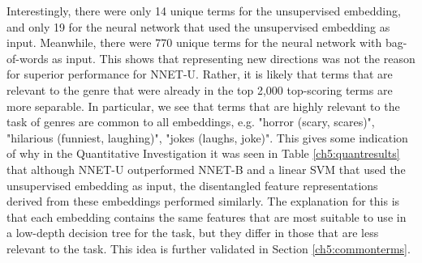 Interestingly, there were only 14 unique terms for the unsupervised embedding, and only 19 for the neural network that used the unsupervised embedding as input. Meanwhile, there were 770 unique terms for the neural network with bag-of-words as input. This shows that representing new directions was not the reason for superior performance for NNET-U. Rather, it is likely that terms that are relevant to the genre that were already in the top 2,000 top-scoring terms are more separable. In particular, we see that terms that are highly relevant to the task of genres are common to all embeddings, e.g. "horror (scary, scares)", "hilarious (funniest, laughing)", "jokes (laughs, joke)". This gives some indication of why in the Quantitative Investigation it was seen in Table \ref{ch5:quantresults} that although NNET-U outperformed NNET-B and a linear SVM that used the unsupervised embedding as input, the disentangled feature representations derived from these embeddings performed similarly. The explanation for this is that each embedding contains the same features that are most suitable to use in a low-depth decision tree for the task, but they differ in those that are less relevant to the task. This idea is further validated in Section \ref{ch5:commonterms}.


